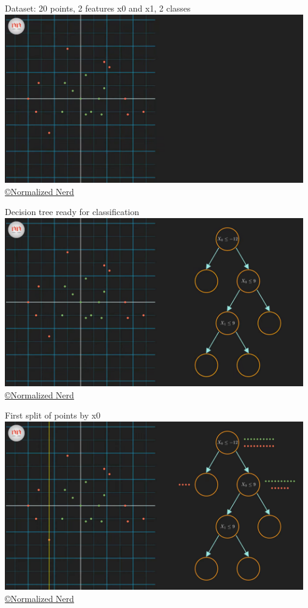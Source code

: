 \documentclass[handout, 10pt]{beamer}
\begin{document}
\begin{frame}{Dataset: 20 points, 2 features x0 and x1, 2 classes}
\hspace*{-1cm}\includegraphics[width=13cm]{dt/_0-48 screenshot}
{\tiny \href{https://www.youtube.com/watch?v=ZVR2Way4nwQ}{ \copyright Normalized Nerd}}
\end{frame}

\begin{frame}{Decision tree ready for classification}
\hspace*{-1cm}\includegraphics[width=13cm]{dt/_1-40 screenshot}
{\tiny \href{https://www.youtube.com/watch?v=ZVR2Way4nwQ}{ \copyright Normalized Nerd}}
\end{frame}

\begin{frame}{First split of points by x0}
\hspace*{-1cm}\includegraphics[width=13cm]{dt/_2-33 screenshot}
{\tiny \href{https://www.youtube.com/watch?v=ZVR2Way4nwQ}{ \copyright Normalized Nerd}}
\end{frame}
\end{document}
